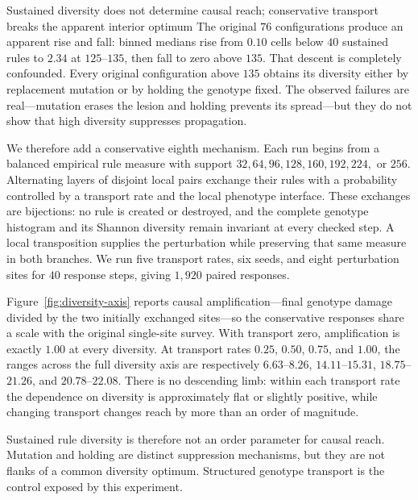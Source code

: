 \begin{empiricalfinding}[label={find:diversity-axis}]{Sustained diversity does not determine causal reach; conservative transport breaks the apparent interior optimum}
The original $76$ configurations produce an apparent rise and fall: binned
medians rise from $0.10$ cells below $40$ sustained rules to $2.34$ at
$125$--$135$, then fall to zero above $135$. That descent is completely
confounded. Every original configuration above $135$ obtains its diversity
either by replacement mutation or by holding the genotype fixed. The observed
failures are real---mutation erases the lesion and holding prevents its
spread---but they do not show that high diversity suppresses propagation.

We therefore add a conservative eighth mechanism. Each run begins from a
balanced empirical rule measure with support
$32,64,96,128,160,192,224,$ or $256$. Alternating layers of disjoint local
pairs exchange their rules with a probability controlled by a transport rate
and the local phenotype interface. These exchanges are bijections: no rule is
created or destroyed, and the complete genotype histogram and its Shannon
diversity remain invariant at every checked step. A local transposition supplies
the perturbation while preserving that same measure in both branches. We run
five transport rates, six seeds, and eight perturbation sites for $40$ response
steps, giving $1{,}920$ paired responses.

Figure~\ref{fig:diversity-axis} reports causal amplification---final genotype
damage divided by the two initially exchanged sites---so the conservative
responses share a scale with the original single-site survey. With transport
zero, amplification is exactly $1.00$ at every diversity. At transport rates
$0.25$, $0.50$, $0.75$, and $1.00$, the ranges across the full diversity axis
are respectively $6.63$--$8.26$, $14.11$--$15.31$, $18.75$--$21.26$, and
$20.78$--$22.08$. There is no descending limb: within each transport rate the
dependence on diversity is approximately flat or slightly positive, while
changing transport changes reach by more than an order of magnitude.

Sustained rule diversity is therefore not an order parameter for causal reach.
Mutation and holding are distinct suppression mechanisms, but they are not
flanks of a common diversity optimum. Structured genotype transport is the
control exposed by this experiment.
\end{empiricalfinding}
